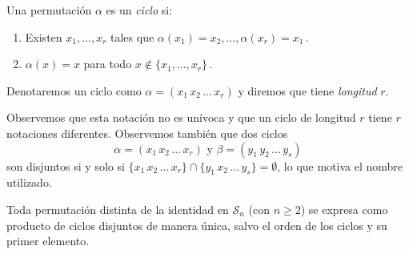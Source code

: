 \begin{ndef}[Ciclo]

Una permutación $\alpha$ es un \textit{ciclo} si: \begin{enumerate}
  \item Existen $x_1, \hdots, x_r$ tales que $\alpha(x_1) = x_2, \hdots, \alpha(x_r) = x_1$\,.
  \item $\alpha(x) = x$ para todo $x \notin \{x_1,\hdots,x_r\}$\,.
\end{enumerate}

Denotaremos un ciclo como  $\alpha = (x_1 \, x_2 \, \hdots \, x_r)$ y diremos que tiene \textit{longitud} $r$.
\end{ndef}

Observemos que esta notación no es unívoca y que un ciclo de longitud $r$ tiene $r$ notaciones diferentes. Observemos también que dos ciclos \begin{equation*}
  \alpha = (x_1 \, x_2 \, ... \, x_r) \text{ y } \beta = (y_1 \, y_2 \, ... \, y_s)
\end{equation*}son disjuntos si y solo si $\{x_1 \, x_2 \, ... \, x_r \} \cap \{y_1 \, x_2 \, ... \, y_s \} = \emptyset$, lo que motiva el nombre utilizado.

\begin{nth}
Toda permutación distinta de la identidad en $\mathcal S_n$ (con $n \ge 2$) se expresa como producto de ciclos disjuntos de manera única, salvo el orden de los ciclos y su primer elemento.
\end{nth}

